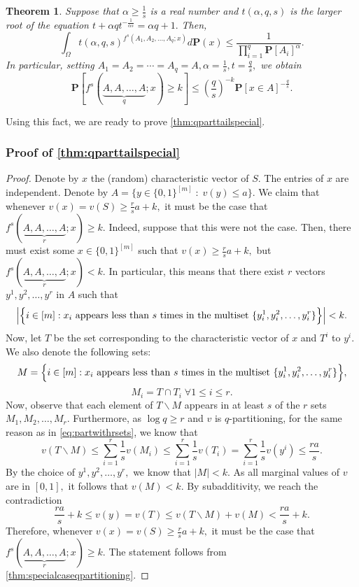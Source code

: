 \documentclass[11pt]{article}\usepackage{amsfonts}
\newtheorem{theorem}{Theorem}
\numberwithin{theorem}{subsection}
\newcommand{\prob}{\mathbf{P}}
\begin{document}
\begin{theorem}
\label{thm:talagrandgenerals}
\label{thm:specialcaseqpartitioning}
Suppose that $\alpha\ge \frac{1}{s}$ is a real number and $t(\alpha, q,s)$ is the larger root of the equation $t + \alpha q t^{-\frac{1}{\alpha s}} = \alpha q + 1.$ Then, 
$$
\int_{\Omega}
t(\alpha, q, s)^{f^s(A_1, A_2, \ldots, A_q; x)}d\prob(x)\le 
\frac{1}{\prod_{i=1}^q \prob[A_i]^{\alpha}}.
$$
In particular, setting $A_1 = A_2 = \cdots = A_q = A, \alpha = \frac{1}{s}, t = \frac{q}{s},$ we obtain
$$\prob[f^s(\underbrace{A, A, \ldots, A}_{q}; x)\ge k]\le 
\left(\frac{q}{s}\right)^{-k}\prob[x \in A]^{-\frac{q}{s}}.$$
\end{theorem}

\noindent
Using this fact, we are ready to prove \cref{thm:qparttailspecial}.

\subsubsection{Proof of \cref{thm:qparttailspecial}}
\begin{proof}
Denote by $x$ the (random) characteristic vector of $S.$ The entries of $x$ are independent. Denote by $A=  \{y\in \{0,1\}^{[m]}\; : \; v(y)\le a\}.$ We claim that whenever $v(x) = v(S)\ge \frac{r}{s}a+k,$ it must be the case that $f^s(\underbrace{A,A,\ldots, A}_r; x)\ge k$. Indeed, suppose that this were not the case. Then, there must exist some $x\in \{0,1\}^{[m]}$ such that $v(x)\ge \frac{r}{s}a+k,$ but $f^s(\underbrace{A,A,\ldots, A}_r; x)< k.$ In particular, this means that there exist $r$ vectors $y^{1}, y^2, \ldots, y^r$ in $A$ such that 
$$
\Big{|}\Big{\{}i\in [m]: x_i \text{ appears less than $s$ times in the multiset }  \{y^1_i, y^2_i, \ldots, y^r_i\}\Big{\}}\Big{|}<k.
$$
Now, let $T$ be the set corresponding to the characteristic vector of $x$ and $T^i$ to $y^i.$ We also denote the following sets:
$$
M = \Big{\{}i\in [m]: x_i \text{ appears less than $s$ times in the multiset }  \{y^1_i, y^2_i, \ldots, y^r_i\}\Big{\}},
$$
$$
M_i = T\cap T_i\; \forall 1\le i \le r.$$
Now, observe that each element of $T\backslash M$ appears in at least $s$ of the $r$ sets  $M_1, M_2, \ldots, M_r.$ Furthermore, as $\log q\ge r$ and $v$ is $q$-partitioning, for the same reason as in \cref{eq:partwithrsets}, we know that 
$$
v(T\backslash M)\le \sum_{i=1}^r \frac{1}{s}v(M_i)\le 
\sum_{i=1}^r \frac{1}{s}v(T_i) = 
\sum_{i=1}^r \frac{1}{s}v(y^i)
\le 
\frac{ra}{s}.
$$
By the choice of $y^1, y^2, \ldots, y^r,$ we know that $|M|<k.$ As all marginal values of $v$ are in $[0,1],$ it follows that $v(M)<k.$ By subadditivity, we reach the contradiction
$$
\frac{ra}{s} + k \le 
v(y) = v(T)\le 
v(T\backslash M) + v(M)< 
\frac{ra}{s} + k.
$$
Therefore, whenever  $v(x) = v(S)\ge \frac{r}{s}a+k,$ it must be the case that $f^s(\underbrace{A,A,\ldots, A}_r; x)\ge k.$ The statement follows from \cref{thm:specialcaseqpartitioning}.
\end{proof}
\end{document}
